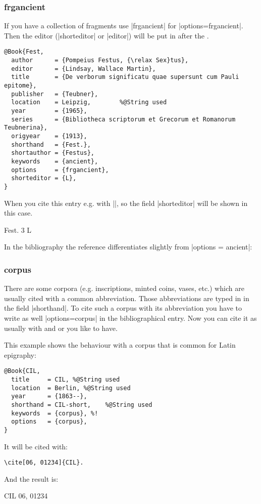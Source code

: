 \documentclass[a4paper,
10pt,
greek,
french,
spanish,
italian,
ngerman,
english
]{ltxdoc}
\begin{document}
\subsubsection{frgancient}\label{frgancient}
 If you have a collection of fragments use |frgancient| for |options={frgancient}|.
 Then the editor (|shorteditor| or |editor|) will be put in after the .
\begin{lstlisting}[style=bibentry,label=Fest,caption={{@}Book\{Fest,…\} }]
@Book{Fest,
  author      = {Pompeius Festus, {\relax Sex}tus},
  editor      = {Lindsay, Wallace Martin},
  title       = {De verborum significatu quae supersunt cum Pauli epitome},
  publisher   = {Teubner},
  location    = Leipzig, 		%@String used
  year        = {1965},
  series      = {Bibliotheca scriptorum et Grecorum et Romanorum Teubnerina},
  origyear    = {1913},
  shorthand   = {Fest.},
  shortauthor = {Festus},
  keywords    = {ancient},
  options     = {frgancient},
  shorteditor = {L},
}
\end{lstlisting}
When you cite this entry  e.g. with |\cite[3]{Fest}|, so the field  |shorteditor| will be shown in this case.
 \begin{bsp}
 Fest. 3 L
 \end{bsp}
In the bibliography the reference  differentiates slightly from  |options = {ancient}|:



\subsubsection{corpus}\label{corpus}
There are some corpora (e.g. inscriptions, minted coins, vases, etc.) which are usually cited with a common abbreviation. 
Those abbreviations are typed in in the field |shorthand|.
To cite such a corpus with its abbreviation you have to write as well |options={corpus}| in the bibliographical entry.
Now you can cite it as usually with and  or  you like to have.

This example shows the behaviour with a corpus that is common for Latin epigraphy:
\begin{lstlisting}[style=bibentry,label=CIL,caption={{@}Book\{CIL,…\} }]
@Book{CIL,
  title     = CIL, %@String used
  location  = Berlin, %@String used
  year      = {1863--},
  shorthand = CIL-short,	%@String used
  keywords  = {corpus}, %!
  options   = {corpus},
}
\end{lstlisting}
It will be cited with:
\begin{lstlisting}
\cite[06, 01234]{CIL}.\end{lstlisting}
And the result is:
\begin{bsp}
CIL 06, 01234
\end{bsp}
\end{document}
